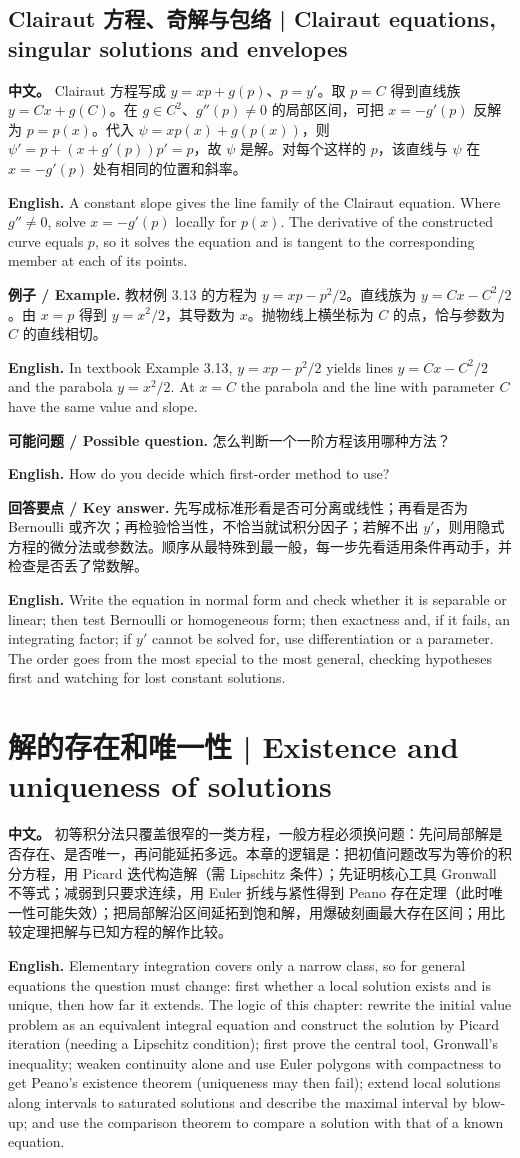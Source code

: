 \documentclass[UTF8,11pt,a4paper]{ctexart}
\newcommand{\APS}[2]{\par\noindent\textbf{中文。} #1\par\noindent\textbf{English.} #2\par}
\newcommand{\EN}[1]{\par\noindent \textbf{English.} #1\par}
\newcommand{\EX}[2]{\par\noindent \textbf{例子 / Example.} #1\par\EN{#2}}
\newcommand{\ASK}[4]{\par\noindent \textbf{可能问题 / Possible question.} #1\par\EN{#2}\noindent \textbf{回答要点 / Key answer.} #3\par\EN{#4}\medskip}
\begin{document}
\subsection{Clairaut 方程、奇解与包络 | Clairaut equations, singular solutions and envelopes}
\APS{Clairaut 方程写成 $y=xp+g(p)$、$p=y'$。取 $p=C$ 得到直线族 $y=Cx+g(C)$。在 $g\in C^2$、$g''(p)\ne0$ 的局部区间，可把 $x=-g'(p)$ 反解为 $p=p(x)$。代入 $\psi=xp(x)+g(p(x))$，则 $\psi'=p+(x+g'(p))p'=p$，故 $\psi$ 是解。对每个这样的 $p$，该直线与 $\psi$ 在 $x=-g'(p)$ 处有相同的位置和斜率。}{A constant slope gives the line family of the Clairaut equation. Where $g''\ne0$, solve $x=-g'(p)$ locally for $p(x)$. The derivative of the constructed curve equals $p$, so it solves the equation and is tangent to the corresponding member at each of its points.}
\EX{教材例 3.13 的方程为 $y=xp-p^2/2$。直线族为 $y=Cx-C^2/2$。由 $x=p$ 得到 $y=x^2/2$，其导数为 $x$。抛物线上横坐标为 $C$ 的点，恰与参数为 $C$ 的直线相切。}{In textbook Example 3.13, $y=xp-p^2/2$ yields lines $y=Cx-C^2/2$ and the parabola $y=x^2/2$. At $x=C$ the parabola and the line with parameter $C$ have the same value and slope.}
\ASK{怎么判断一个一阶方程该用哪种方法？}{How do you decide which first-order method to use?}{先写成标准形看是否可分离或线性；再看是否为 Bernoulli 或齐次；再检验恰当性，不恰当就试积分因子；若解不出 $y'$，则用隐式方程的微分法或参数法。顺序从最特殊到最一般，每一步先看适用条件再动手，并检查是否丢了常数解。}{Write the equation in normal form and check whether it is separable or linear; then test Bernoulli or homogeneous form; then exactness and, if it fails, an integrating factor; if $y'$ cannot be solved for, use differentiation or a parameter. The order goes from the most special to the most general, checking hypotheses first and watching for lost constant solutions.}

\section[存在唯一性]{解的存在和唯一性 | Existence and uniqueness of solutions}
\APS{初等积分法只覆盖很窄的一类方程，一般方程必须换问题：先问局部解是否存在、是否唯一，再问能延拓多远。本章的逻辑是：把初值问题改写为等价的积分方程，用 Picard 迭代构造解（需 Lipschitz 条件）；先证明核心工具 Gronwall 不等式；减弱到只要求连续，用 Euler 折线与紧性得到 Peano 存在定理（此时唯一性可能失效）；把局部解沿区间延拓到饱和解，用爆破刻画最大存在区间；用比较定理把解与已知方程的解作比较。}{Elementary integration covers only a narrow class, so for general equations the question must change: first whether a local solution exists and is unique, then how far it extends. The logic of this chapter: rewrite the initial value problem as an equivalent integral equation and construct the solution by Picard iteration (needing a Lipschitz condition); first prove the central tool, Gronwall's inequality; weaken continuity alone and use Euler polygons with compactness to get Peano's existence theorem (uniqueness may then fail); extend local solutions along intervals to saturated solutions and describe the maximal interval by blow-up; and use the comparison theorem to compare a solution with that of a known equation.}
\end{document}
